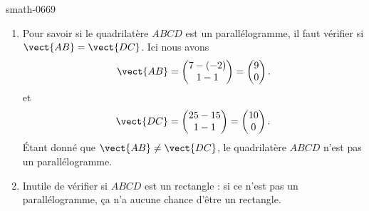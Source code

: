 
\begin{corrige}{smath-0669}

    \begin{enumerate}
        \item
            Pour savoir si le quadrilatère \( ABCD\) est un parallélogramme, il faut vérifier si \( \vect{ AB }=\vect{ DC }\). Ici nous avons
            \begin{equation}
                \vect{ AB }=\begin{pmatrix}
                    7-(-2)    \\ 
                    1-1    
                \end{pmatrix}=\begin{pmatrix}
                    9    \\ 
                    0    
                \end{pmatrix}.
            \end{equation}
            et
            \begin{equation}
                \vect{ DC }=\begin{pmatrix}
                    25-15    \\ 
                    1-1    
                \end{pmatrix}=\begin{pmatrix}
                    10    \\ 
                    0    
                \end{pmatrix}.
            \end{equation}
            Étant donné que \( \vect{ AB }\neq \vect{ DC }\), le quadrilatère \( ABCD\) n'est pas un parallélogramme.
        \item
            Inutile de vérifier si \( ABCD\) est un rectangle : si ce n'est pas un parallélogramme, ça n'a aucune chance d'être un rectangle.


\end{enumerate}
\end{corrige}
